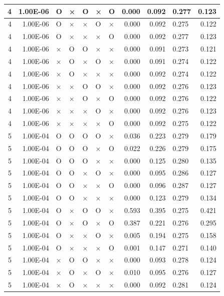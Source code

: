 \documentclass[11pt]{article}
\begin{document}
\begin{longtable}[h]{|r|r|l|l|l|l|l|r|r|l|r|}
4 & 1.00E-06 & O & × & O & × & O & 0.000 & 0.092 & 0.277 & 0.123 \\ \hline
4 & 1.00E-06 & O & × & × & O & × & 0.000 & 0.092 & 0.275 & 0.122 \\ \hline
4 & 1.00E-06 & O & × & × & × & O & 0.000 & 0.092 & 0.277 & 0.123 \\ \hline
4 & 1.00E-06 & × & O & O & × & × & 0.000 & 0.091 & 0.273 & 0.121 \\ \hline
4 & 1.00E-06 & × & O & × & O & × & 0.000 & 0.091 & 0.274 & 0.122 \\ \hline
4 & 1.00E-06 & × & O & × & × & × & 0.000 & 0.092 & 0.274 & 0.122 \\ \hline
4 & 1.00E-06 & × & × & O & O & × & 0.000 & 0.092 & 0.276 & 0.123 \\ \hline
4 & 1.00E-06 & × & × & O & × & O & 0.000 & 0.092 & 0.276 & 0.122 \\ \hline
4 & 1.00E-06 & × & × & × & O & × & 0.000 & 0.092 & 0.276 & 0.123 \\ \hline
4 & 1.00E-06 & × & × & × & × & O & 0.000 & 0.092 & 0.275 & 0.122 \\ \hline
5 & 1.00E-04 & O & O & O & O & × & 0.036 & 0.223 & 0.279 & 0.179 \\ \hline
5 & 1.00E-04 & O & O & O & × & O & 0.022 & 0.226 & 0.279 & 0.175 \\ \hline
5 & 1.00E-04 & O & O & O & × & × & 0.000 & 0.125 & 0.280 & 0.135 \\ \hline
5 & 1.00E-04 & O & O & × & O & × & 0.000 & 0.095 & 0.286 & 0.127 \\ \hline
5 & 1.00E-04 & O & O & × & × & O & 0.000 & 0.096 & 0.287 & 0.127 \\ \hline
5 & 1.00E-04 & O & O & × & × & × & 0.000 & 0.123 & 0.279 & 0.134 \\ \hline
5 & 1.00E-04 & O & × & O & O & × & 0.593 & 0.395 & 0.275 & 0.421 \\ \hline
5 & 1.00E-04 & O & × & O & × & O & 0.387 & 0.221 & 0.276 & 0.295 \\ \hline
5 & 1.00E-04 & O & × & × & O & × & 0.005 & 0.194 & 0.275 & 0.158 \\ \hline
5 & 1.00E-04 & O & × & × & × & O & 0.001 & 0.147 & 0.271 & 0.140 \\ \hline
5 & 1.00E-04 & × & O & O & × & × & 0.000 & 0.093 & 0.278 & 0.124 \\ \hline
5 & 1.00E-04 & × & O & × & O & × & 0.010 & 0.095 & 0.276 & 0.127 \\ \hline
5 & 1.00E-04 & × & O & × & × & × & 0.000 & 0.092 & 0.281 & 0.124 \\ \hline

\end{longtable}
\end{document}
